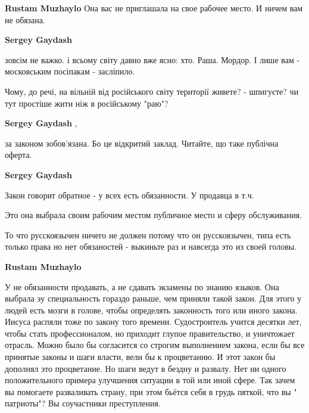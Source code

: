 \begin{itemize}
\begin{itemize}
\textbf{Rustam Muzhaylo} Она вас не приглашала на свое рабочее место. И ничем вам не обязана.

 
\textbf{Sergey Gaydash} 

зовсім не важко. і всьому світу давно вже ясно: хто. Раша. Мордор. І лише вам -
московським посіпакам - засліпило.

Чому, до речі, на вільній від російського світу території живете? - шпигуєте?
чи тут простіше жити ніж в російському "раю"?

 
\textbf{Sergey Gaydash} , 

за законом зобов'язана. Бо це відкритий заклад. Читайте, що таке публічна
оферта.


 
\textbf{Sergey Gaydash}

Закон говорит обратное - у всех есть обязанности. У продавца в т.ч.

Это она выбрала своим рабочим местом публичное место и сферу обслуживания.

То что русскоязычен ничего не должен потому что он русскоязычен, типа есть
только права но нет обязаностей - выкиньте раз и навсегда это из своей головы.

 
\textbf{Rustam Muzhaylo} 

У не обязанности продавать, а не сдавать экзамены по знанию языков. Она выбрала
эу специальность гораздо раньше, чем приняли такой закон. Для этого у людей
есть мозги в голове, чтобы определять законность того или иного закона. Иисуса
распяли тоже по закону того времени. Судостроитель учится десятки лет, чтобы
стать профессионалом, но приходит глупое правительство, и уничтожает отрасль.
Можно было бы согласится со строгим выполнением закона, если бы все принятые
законы и шаги власти, вели бы к процветанию. И этот закон бы дополнял это
процветание. Но шаги ведут в бездну и развалу. Нет ни одного положительного
примера улучшения ситуации в той или иной сфере. Так зачем вы помогаете
разваливать страну, при этом бьётся себя в грудь пяткой, что вы " патриоты"? Вы
соучастники преступления.


\end{itemize}
\end{itemize}
